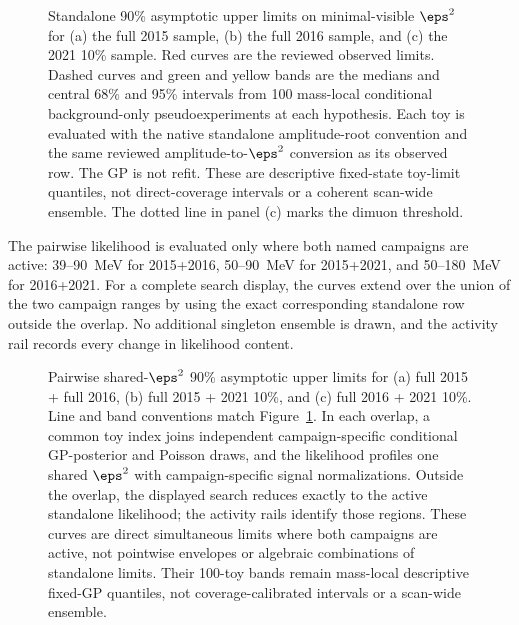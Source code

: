 \begin{figure}[H]
\centering
{}
\caption{Standalone 90\% asymptotic \CLs{} upper limits on minimal-visible
$\eps^2$ for (a) the full 2015 sample, (b) the full 2016 sample, and (c) the
2021 10\% sample. Red curves are the reviewed observed limits. Dashed curves
and green and yellow bands are the medians and central 68\% and 95\% intervals
from 100 mass-local conditional background-only pseudoexperiments at each
hypothesis. Each toy is evaluated with the native standalone amplitude-root
convention and the same reviewed amplitude-to-$\eps^2$ conversion as its
observed row. The GP is not refit. These are descriptive fixed-state
toy-limit quantiles, not direct-coverage intervals or a coherent scan-wide
ensemble. The dotted line in panel (c) marks the dimuon threshold.}
\label{fig:results-v4p2-standalone-bands}
\end{figure}

The pairwise likelihood is evaluated only where both named campaigns are
active: 39--90~MeV for 2015+2016, 50--90~MeV for 2015+2021, and
50--180~MeV for 2016+2021. For a complete search display, the curves extend
over the union of the two campaign ranges by using the exact corresponding
standalone row outside the overlap. No additional singleton ensemble is drawn,
and the activity rail records every change in likelihood content.

\begin{figure}[H]
\centering
{}
\caption{Pairwise shared-$\eps^2$ 90\% asymptotic \CLs{} upper limits for
(a) full 2015 + full 2016, (b) full 2015 + 2021 10\%, and (c) full 2016 +
2021 10\%. Line and band conventions match
Figure~\ref{fig:results-v4p2-standalone-bands}. In each overlap, a common toy
index joins independent campaign-specific conditional GP-posterior and Poisson
draws, and the likelihood profiles one shared $\eps^2$ with campaign-specific
signal normalizations. Outside the overlap, the displayed search reduces
exactly to the active standalone likelihood; the activity rails identify those
regions. These curves are direct simultaneous limits where both campaigns are
active, not pointwise envelopes or algebraic combinations of standalone
limits. Their 100-toy bands remain mass-local descriptive fixed-GP quantiles,
not coverage-calibrated intervals or a scan-wide ensemble.}
\label{fig:results-v4p2-pairwise-bands}
\end{figure}

